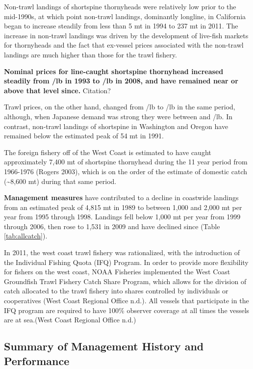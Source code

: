 \documentclass[11pt,
  english,
  letterpaper,
]{article}
\begin{document}
Non-trawl landings of shortspine thornyheads were relatively low prior to the mid-1990s, at which point non-trawl landings, dominantly longline, in California began to increase steadily from less than 5 mt in 1994 to 237 mt in 2011. The increase in non-trawl landings was driven by the development of live-fish markets for thornyheads and the fact that ex-vessel prices associated with the non-trawl landings are much higher than those for the trawl fishery.

\textbf{Nominal prices for line-caught shortspine thornyhead increased steadily from /lb in 1993 to /lb in 2008, and have remained near or above that level since.} Citation?

Trawl prices, on the other hand, changed from /lb to /lb in the same period, although, when Japanese demand was strong they were between  and /lb. In contrast, non-trawl landings of shortspine in Washington and Oregon have remained below the estimated peak of 54 mt in 1991.

The foreign fishery off of the West Coast is estimated to have caught approximately 7,400 mt of shortspine thornyhead during the 11 year period from 1966-1976 (Rogers 2003), which is on the order of the estimate of domestic catch (\textasciitilde8,600 mt) during that same period.

\textbf{Management measures} have contributed to a decline in coastwide landings from an estimated peak of 4,815 mt in 1989 to between 1,000 and 2,000 mt per year from 1995 through 1998. Landings fell below 1,000 mt per year from 1999 through 2006, then rose to 1,531 in 2009 and have declined since (Table \ref{tab:allcatch}).

In 2011, the west coast trawl fishery was rationalized, with the introduction of the Individual Fishing Quota (IFQ) Program. In order to provide more flexibility for fishers on the west coast, NOAA Fisheries implemented the West Coast Groundfish Trawl Fishery Catch Share Program, which allows for the division of catch allocated to the trawl fishery into shares controlled by individuals or cooperatives (West Coast Regional Office n.d.). All vessels that participate in the IFQ program are required to have 100\% observer coverage at all times the vessels are at sea.(West Coast Regional Office n.d.)

\hypertarget{summary-of-management-history-and-performance}{%
\subsection{Summary of Management History and Performance}\label{summary-of-management-history-and-performance}}
\end{document}
